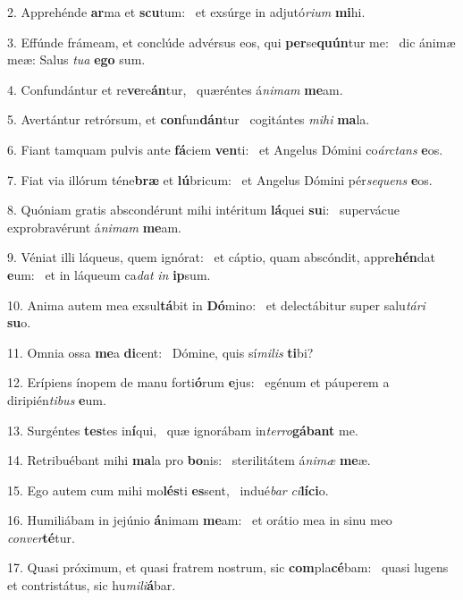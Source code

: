 2. Apprehénde \textbf{ar}ma et \textbf{scu}tum: \ast\  et exsúrge in adjutó\textit{ri}\textit{um} \textbf{mi}hi.\

3. Effúnde frámeam, et conclúde advérsus eos, qui \textbf{per}se\textbf{quún}tur me: \ast\  dic ánimæ meæ: Salus \textit{tu}\textit{a} \textbf{e}\textbf{go} sum.\

4. Confundántur et re\textbf{ve}re\textbf{án}tur, \ast\  quæréntes á\textit{ni}\textit{mam} \textbf{me}am.\

5. Avertántur retrórsum, et \textbf{con}fun\textbf{dán}tur \ast\  cogitántes \textit{mi}\textit{hi} \textbf{ma}la.\

6. Fiant tamquam pulvis ante \textbf{fá}ciem \textbf{ven}ti: \ast\  et Angelus Dómini co\textit{árc}\textit{tans} \textbf{e}os.\

7. Fiat via illórum téne\textbf{bræ} et \textbf{lú}bricum: \ast\  et Angelus Dómini pér\textit{se}\textit{quens} \textbf{e}os.\

8. Quóniam gratis abscondérunt mihi intéritum \textbf{lá}quei \textbf{su}i: \ast\  supervácue exprobravérunt á\textit{ni}\textit{mam} \textbf{me}am.\

9. Véniat illi láqueus, quem ignórat: \dag\  et cáptio, quam abscóndit, appre\textbf{hén}dat \textbf{e}um: \ast\  et in láqueum ca\textit{dat} \textit{in} \textbf{ip}sum.\

10. Anima autem mea exsul\textbf{tá}bit in \textbf{Dó}mino: \ast\  et delectábitur super salu\textit{tá}\textit{ri} \textbf{su}o.\

11. Omnia ossa \textbf{me}a \textbf{di}cent: \ast\  Dómine, quis sí\textit{mi}\textit{lis} \textbf{ti}bi?\

12. Erípiens ínopem de manu forti\textbf{ó}rum \textbf{e}jus: \ast\  egénum et páuperem a diripién\textit{ti}\textit{bus} \textbf{e}um.\

13. Surgéntes \textbf{tes}tes in\textbf{í}qui, \ast\  quæ ignorábam in\textit{ter}\textit{ro}\textbf{gá}\textbf{bant} me.\

14. Retribuébant mihi \textbf{ma}la pro \textbf{bo}nis: \ast\  sterilitátem á\textit{ni}\textit{mæ} \textbf{me}æ.\

15. Ego autem cum mihi mo\textbf{lés}ti \textbf{es}sent, \ast\  indué\textit{bar} \textit{ci}\textbf{lí}\textbf{ci}o.\

16. Humiliábam in jejúnio \textbf{á}nimam \textbf{me}am: \ast\  et orátio mea in sinu meo \textit{con}\textit{ver}\textbf{té}tur.\

17. Quasi próximum, et quasi fratrem nostrum, sic \textbf{com}pla\textbf{cé}bam: \ast\  quasi lugens et contristátus, sic hu\textit{mi}\textit{li}\textbf{á}bar.\

